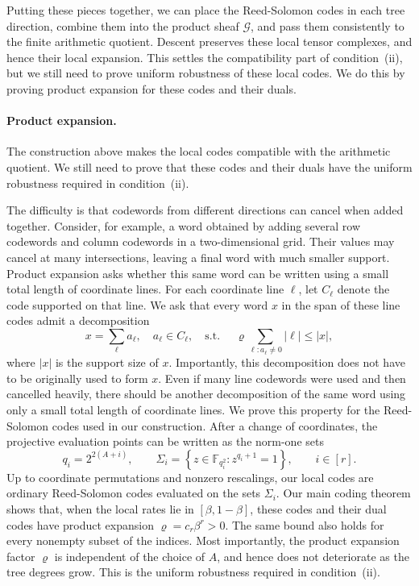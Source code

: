 \documentclass[11pt,letterpaper]{article}
\renewcommand{\le}{\leqslant}
\theoremstyle{definition}
\theoremstyle{remark}
\newcommand{\F}{\mathbb F}
\begin{document}
Putting these pieces together, we can place the Reed-Solomon codes in each tree direction, combine them into the product sheaf $\mathcal G$, and pass them consistently to the finite arithmetic quotient. Descent preserves these local tensor complexes, and hence their local expansion. This settles the compatibility part of condition~(ii), but we still need to prove uniform robustness of these local codes. We do this by proving product expansion for these codes and their duals.

\paragraph{Product expansion.}
The construction above makes the local codes compatible
with the arithmetic quotient.
We still need to prove that these codes and their duals
have the uniform robustness required in condition~(ii).

The difficulty is that codewords from different directions
can cancel when added together.
Consider, for example, a word obtained by adding several
row codewords and column codewords in a two-dimensional grid.
Their values may cancel at many intersections, leaving
a final word with much smaller support.
Product expansion asks whether this same word can be
written using a small total length of coordinate lines. For each coordinate line $\ell$, let $C_\ell$ denote the code supported on that line. We ask that every word $x$ in the span of these line codes admit a decomposition $$x=\sum_\ell a_\ell,\quad a_\ell\in C_\ell,\quad \text{s.t.    }\quad\varrho\sum_{\ell:a_\ell\neq0}|\ell|\le |x|,$$ where $|x|$ is the support size of $x$. Importantly, this decomposition does not have to be originally used to form $x$. Even if many line codewords were used and then cancelled heavily, there should be another decomposition of the same word using only a small total length of coordinate lines. We prove this property for the Reed-Solomon codes used in our construction. After a change of coordinates, the projective evaluation points can be written as the norm-one sets $$q_i=2^{2(A+i)},\qquad\Sigma_i=\left\{z\in\F_{q_i^2}: z^{q_i+1}=1\right\},\qquad i\in[r].$$
    Up to coordinate permutations and nonzero rescalings, our local codes are ordinary Reed-Solomon codes evaluated on the sets $\Sigma_i$. Our main coding theorem shows that, when the local rates lie in $[\beta,1-\beta]$, these codes and their dual codes have product expansion $\varrho=c_r\beta^r>0.$
    The same bound also holds for every nonempty subset of the indices. Most importantly, the product expansion factor $\varrho$ is independent of the choice of $A$, and hence does not deteriorate as the tree degrees grow. This is the uniform robustness required in condition~(ii). 
    
\end{document}
